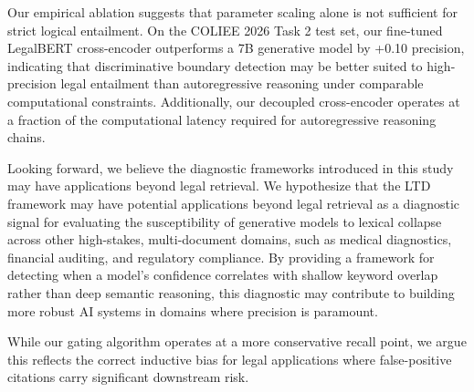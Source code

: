 \documentclass[sigconf]{acmart}
\newcommand{\rev}[1]{{\color{blue}#1}}
\begin{document}
Our empirical ablation suggests that parameter scaling alone is not sufficient for strict logical entailment. On the COLIEE 2026 Task 2 test set, our fine-tuned LegalBERT cross-encoder outperforms a 7B generative model by +0.10 precision, indicating that discriminative boundary detection may be better suited to high-precision legal entailment than autoregressive reasoning under comparable computational constraints. Additionally, our decoupled cross-encoder operates at a fraction of the computational latency required for autoregressive reasoning chains.

Looking forward, we believe the diagnostic frameworks introduced in this study may have applications beyond legal retrieval. \rev{We hypothesize that the LTD framework may have potential applications beyond legal retrieval as a diagnostic signal for evaluating the susceptibility of generative models to lexical collapse across other high-stakes, multi-document domains}, such as medical diagnostics, financial auditing, and regulatory compliance. By providing a framework for detecting when a model's confidence correlates with shallow keyword overlap rather than deep semantic reasoning, this diagnostic may contribute to building more robust AI systems in domains where precision is paramount.

\rev{While our gating algorithm operates at a more conservative recall point, we argue this reflects the correct inductive bias for legal applications where false-positive citations carry significant downstream risk.}


 

\end{document}
